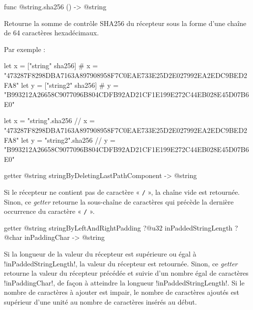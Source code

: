 \begin{galgas4box}
func @string.sha256 () -> @string
\end{galgas4box}

Retourne la somme de contrôle SHA256 du récepteur sous la forme d'une chaîne de 64 caractères hexadécimaux.

Par exemple :
\begin{galgas4}
  let x = ["string"  sha256]
    # x = "473287F8298DBA7163A897908958F7C0EAE733E25D2E027992EA2EDC9BED2FA8"
  let y = ["string2" sha256]
    # y = "B993212A26658C9077096B804CDFB92AD21CF1E199E272C44EB028E45D07B6E0"
\end{galgas4}

\begin{galgas4}
  let x = "string".sha256
   // x = "473287F8298DBA7163A897908958F7C0EAE733E25D2E027992EA2EDC9BED2FA8"
  let y = "string2".sha256
   // y = "B993212A26658C9077096B804CDFB92AD21CF1E199E272C44EB028E45D07B6E0"
\end{galgas4}










\begin{galgas4box}
getter @string stringByDeletingLastPathComponent -> @string
\end{galgas4box}

Si le récepteur ne contient pas de caractère « \texttt{/} », la chaîne vide est retournée. Sinon, ce \emph{getter} retourne la sous-chaîne de caractères qui précède la dernière occurrence du caractère « \texttt{/} ».








\begin{galgas4box}
getter @string stringByLeftAndRightPadding
   ?@u32 inPaddedStringLength
   ?@char inPaddingChar -> @string
\end{galgas4box}

Si la longueur de la valeur du récepteur est supérieure ou égal à \ggsq!inPaddedStringLength!, la valeur du récepteur est retournée. Sinon, ce \emph{getter} retourne la valeur du récepteur précédée et suivie d'un nombre égal de caractères \ggsq!inPaddingChar!, de façon à atteindre la longueur \ggsq!inPaddedStringLength!. Si le nombre de caractères à ajouter est impair, le nombre de caractères ajoutés est supérieur d'une unité au nombre de caractères insérés au début.








